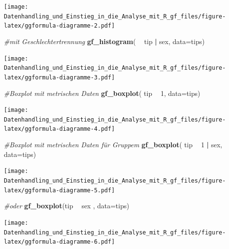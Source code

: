 \documentclass[10pt,ngerman,onside]{article}
\newenvironment{Shaded}{\begin{snugshade}}{\end{snugshade}}
\newcommand{\KeywordTok}[1]{\textcolor[rgb]{0.13,0.29,0.53}{\textbf{#1}}}
\newcommand{\DataTypeTok}[1]{\textcolor[rgb]{0.13,0.29,0.53}{#1}}
\newcommand{\DecValTok}[1]{\textcolor[rgb]{0.00,0.00,0.81}{#1}}
\newcommand{\StringTok}[1]{\textcolor[rgb]{0.31,0.60,0.02}{#1}}
\newcommand{\CommentTok}[1]{\textcolor[rgb]{0.56,0.35,0.01}{\textit{#1}}}
\newcommand{\OperatorTok}[1]{\textcolor[rgb]{0.81,0.36,0.00}{\textbf{#1}}}
\newcommand{\NormalTok}[1]{#1}
\begin{document}
\texttt{[image: Datenhandling\_und\_Einstieg\_in\_die\_Analyse\_mit\_R\_gf\_files/figure-latex/ggformula-diagramme-2.pdf]}

\begin{Shaded}
\begin{Highlighting}[]
\CommentTok{#mit Geschlechtertrennung}
\KeywordTok{gf_histogram}\NormalTok{( }\OperatorTok{~}\StringTok{ }\NormalTok{tip }\OperatorTok{|}\StringTok{ }\NormalTok{sex, }\DataTypeTok{data=}\NormalTok{tips)}
\end{Highlighting}
\end{Shaded}

\texttt{[image: Datenhandling\_und\_Einstieg\_in\_die\_Analyse\_mit\_R\_gf\_files/figure-latex/ggformula-diagramme-3.pdf]}

\begin{Shaded}
\begin{Highlighting}[]
\CommentTok{#Boxplot mit metrischen Daten}
\KeywordTok{gf_boxplot}\NormalTok{( tip }\OperatorTok{~}\StringTok{ }\DecValTok{1}\NormalTok{, }\DataTypeTok{data=}\NormalTok{tips)}
\end{Highlighting}
\end{Shaded}

\texttt{[image: Datenhandling\_und\_Einstieg\_in\_die\_Analyse\_mit\_R\_gf\_files/figure-latex/ggformula-diagramme-4.pdf]}

\begin{Shaded}
\begin{Highlighting}[]
\CommentTok{#Boxplot mit metrischen Daten für Gruppem}
\KeywordTok{gf_boxplot}\NormalTok{( tip }\OperatorTok{~}\StringTok{  }\DecValTok{1} \OperatorTok{|}\StringTok{ }\NormalTok{sex, }\DataTypeTok{data=}\NormalTok{tips)}
\end{Highlighting}
\end{Shaded}

\texttt{[image: Datenhandling\_und\_Einstieg\_in\_die\_Analyse\_mit\_R\_gf\_files/figure-latex/ggformula-diagramme-5.pdf]}

\begin{Shaded}
\begin{Highlighting}[]
\CommentTok{#oder}
\KeywordTok{gf_boxplot}\NormalTok{(tip }\OperatorTok{~}\StringTok{ }\NormalTok{sex , }\DataTypeTok{data=}\NormalTok{tips)}
\end{Highlighting}
\end{Shaded}

\texttt{[image: Datenhandling\_und\_Einstieg\_in\_die\_Analyse\_mit\_R\_gf\_files/figure-latex/ggformula-diagramme-6.pdf]}
\end{document}
